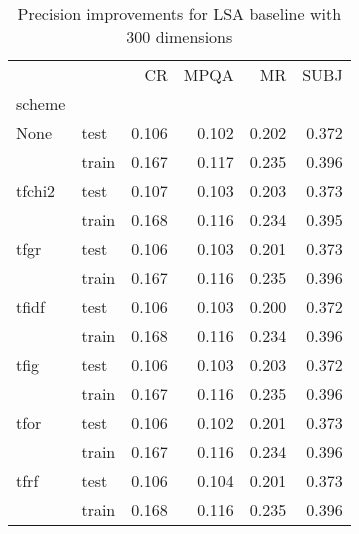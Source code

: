 \begin{table}[h]
\begin{center}

\begin{tabular}{llrrrr}
\toprule
{} &      &  CR &  MPQA &  MR &  SUBJ \\
scheme &  &            &              &            &              \\
\midrule
None & test &      0.106 &        0.102 &      0.202 &        0.372 \\
{} & train &      0.167 &        0.117 &      0.235 &        0.396 \\
tfchi2 & test &      0.107 &        0.103 &      0.203 &        0.373 \\
{} & train &      0.168 &        0.116 &      0.234 &        0.395 \\
tfgr & test &      0.106 &        0.103 &      0.201 &        0.373 \\
{} & train &      0.167 &        0.116 &      0.235 &        0.396 \\
tfidf & test &      0.106 &        0.103 &      0.200 &        0.372 \\
{} & train &      0.168 &        0.116 &      0.234 &        0.396 \\
tfig & test &      0.106 &        0.103 &      0.203 &        0.372 \\
{} & train &      0.167 &        0.116 &      0.235 &        0.396 \\
tfor & test &      0.106 &        0.102 &      0.201 &        0.373 \\
{} & train &      0.167 &        0.116 &      0.234 &        0.396 \\
tfrf & test &      0.106 &        0.104 &      0.201 &        0.373 \\
{} & train &      0.168 &        0.116 &      0.235 &        0.396 \\
\bottomrule
\end{tabular}

\caption[Precision improvements for LSA baseline with 300 dimensions]{Precision improvements for LSA baseline with 300 dimensions}
\label{tab:lsa:resuts:300}
\end{center}
\end{table}



